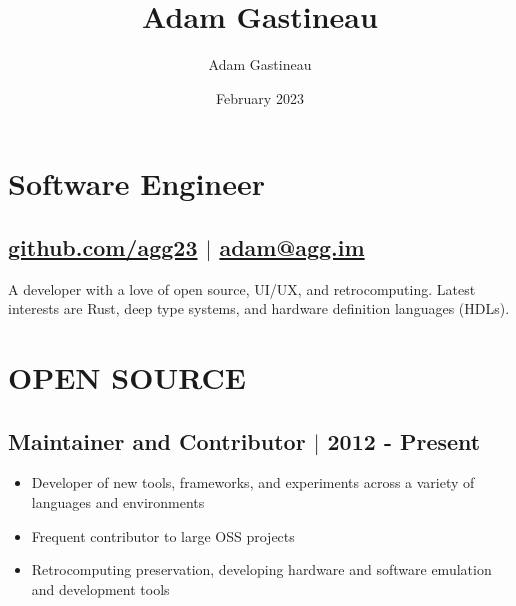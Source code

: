 \documentclass[10pt]{article}
\title{Adam Gastineau}
\author{Adam Gastineau}
\date{February 2023}
\begin{document}
\thispagestyle{empty}

\begin{flushleft}
{\huge\bfseries\theauthor}
\end{flushleft}

\vspace{-38pt}
\begin{flushright}
\end{flushright}
\vspace{-1in}\vspace{6pt}

\section{Software Engineer}
\subsection{\href{https://github.com/agg23}{github.com/agg23} $\vert$ \href{mailto:adam@agg.im}{adam@agg.im}}
\parbox{380pt}{\color{darkgrey}A developer with a love of open source, UI/UX, and retrocomputing. Latest interests are Rust, deep type systems, and hardware definition languages (HDLs).}

\vspace{8pt}
\noindent

\vspace{-8pt}


\section{OPEN SOURCE}
\subsection{Maintainer and Contributor $\vert$ 2012 - Present}
\begin{itemize}
    \item Developer of new tools, frameworks, and experiments across a variety of languages and environments
    \item Frequent contributor to large OSS projects
    \item Retrocomputing preservation, developing hardware and software emulation and development tools
\end{itemize}
\end{document}

